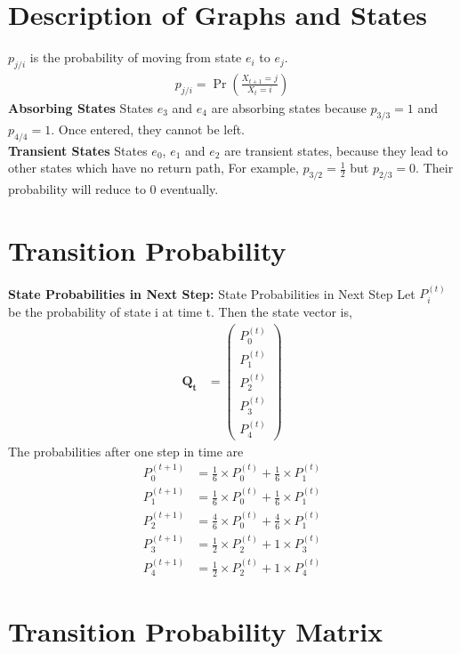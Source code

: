 \documentclass[journal,12pt,two column]{IEEEtran}
\providecommand{\pr}[1]{\ensuremath{\Pr\left(#1\right)}}
\providecommand{\pr}[1]{\ensuremath{\Pr\left(#1\right)}}
\providecommand{\prt}[2]{\ensuremath{P_{#1}^{\left(#2\right)} }}        %
\theoremstyle{remark}
\newcommand{\myvec}[1]{\ensuremath{\begin{pmatrix}#1\end{pmatrix}}}
\let\vec\mathbf
\begin{document}
\section{Description of Graphs and States}
 $p_{j/i}$ is the probability of moving from state $e_i$ to $e_j$.
    \begin{align}
    p_{j/i} = \pr{\frac{ X_{t+1}=j } {X_t=i} }
    \end{align}
    \textbf{Absorbing States}
    States $e_3$ and $e_4$ are absorbing states because $p_{3/3}=1$ and $p_{4/4}=1$. Once entered, they cannot be left.\\
    \textbf{Transient States}
    States $e_0$, $e_1$ and $e_2$ are transient states, because they lead to other states which have no return path, For example, $p_{3/2}=\frac{1}{2}$ but $p_{2/3}= 0$. Their probability will reduce to 0 eventually.   
\section{Transition Probability}
\textbf{State Probabilities in Next Step:}
{State Probabilities in Next Step}
    Let $\prt{i}{t}$ be the probability of state i at time t. 
    Then the state vector is,   
    \begin{align}
        \vec{Q_t} &= \myvec{\prt{0}{t}\\ 
        			        \prt{1}{t} \\
        			        \prt{2}{t} \\
        			        \prt{3}{t} \\
        			        \prt{4}{t} }
    \end{align}    
    The probabilities after one step in time are
    \begin{align}
       \prt{0}{t+1} &= \frac{1}{6} \times \prt{0}{t} + \frac{1}{6} \times \prt{1}{t} \\
       \prt{1}{t+1} &= \frac{1}{6} \times \prt{0}{t} + \frac{1}{6} \times \prt{1}{t} \\
       \prt{2}{t+1} &= \frac{4}{6} \times \prt{0}{t} + \frac{4}{6} \times \prt{1}{t} \\
       \prt{3}{t+1} &= \frac{1}{2} \times \prt{2}{t} + 1 \times \prt{3}{t} \\
       \prt{4}{t+1} &= \frac{1}{2} \times \prt{2}{t} + 1 \times \prt{4}{t} 
    \end{align}
    
\section{Transition Probability Matrix}
\end{document}
